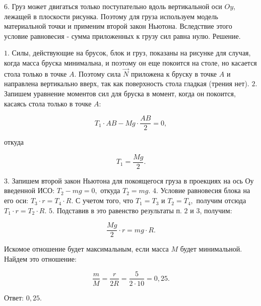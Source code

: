 \documentclass[12pt,a4paper]{article}
\begin{document}
{$6$.  Груз может двигаться только поступательно вдоль вертикальной оси $Oy$, лежащей в плоскости рисунка. Поэтому для груза используем модель материальной точки и применим второй закон Ньютона. Вследствие этого условие равновесия - сумма приложенных к грузу сил равна нулю.
Решение.\begin{center}\end{center}
$1$.  Силы, действующие на брусок, блок и груз, показаны на рисунке для случая, когда масса бруска минимальна, и поэтому он еще покоится на столе, но касается стола только в точке $A$. Поэтому сила $\vec N$ приложена к бруску в точке $A$ и направлена вертикально вверх, так как поверхность стола гладкая (трения нет). 
$2$.  Запишем уравнение моментов сил для бруска в момент, когда он покоится, касаясь стола только в точке $A$: 

\[T_1 \cdot A B - M g \cdot \frac{A B}{2} =0,\]

 откуда 

\[T_1= \frac{M g}{2} .\]

$3$.  Запишем второй закон Ньютона для покоящегося груза в проекциях на ось Оу введенной ИСО: $T_2 - m g=0,$ откуда $T_2=m g.$ 
$4$.  Условие равновесия блока на его оси: $T_3 \cdot r=T_4 \cdot R .$ С учетом того, что $T_1=T_3$ и $T_2=T_4,$ получим отсюда $T_1 \cdot r=T_2 \cdot R .$
$5$.  Подставив в это равенство результаты п. $2$ и $3$, получим: 

\[\frac{M g}{2} \cdot r=m g \cdot R.\]

Искомое отношение будет максимальным, если масса $M$ будет минимальной. Найдем это отношение:

\[\frac{m}{M} = \frac{r}{2R} = \frac{5}{2 \cdot 10} =0{,}25.\]

Ответ: $0{,}25$.
}
\end{document}
